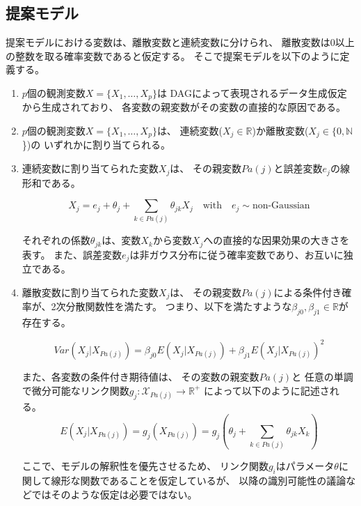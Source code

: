 
\subsection{提案モデル}

提案モデルにおける変数は、離散変数と連続変数に分けられ、
離散変数は0以上の整数を取る確率変数であると仮定する。
そこで提案モデルを以下のように定義する。

\begin{enumerate}
  \item
  $p$個の観測変数$X = \{ X_1, \dots, X_p \}$は
  DAGによって表現されるデータ生成仮定から生成されており、
  各変数の親変数がその変数の直接的な原因である。

  \item
  $p$個の観測変数$X = \{ X_1, \dots, X_p \}$は、
  連続変数($X_j \in \mathbb R$)か離散変数($X_j \in \{0, \mathbb N$\})の
  いずれかに割り当てられる。

  \item
  連続変数に割り当てられた変数$X_j$は、
  その親変数$Pa(j)$と誤差変数$e_j$の線形和である。

  \begin{equation}
    X_j = e_j + \theta_{j} + \sum_{k \in Pa(j)} \theta_{jk}X_j
    \quad \text{with} \quad e_j \sim \text{non-Gaussian}
    \label{eq:lingam_prop}
  \end{equation}

  それぞれの係数$\theta_{jk}$は、変数$X_k$から変数$X_j$への直接的な因果効果の大きさを表す。
  また、誤差変数$e_j$は非ガウス分布に従う確率変数であり、お互いに独立である。

  \item
  離散変数に割り当てられた変数$X_j$は、
  その親変数$Pa(j)$による条件付き確率が、2次分散関数性を満たす。
  つまり、以下を満たすような$\beta_{j0},\beta_{j1} \in \mathbb{R}$が存在する。

  \begin{equation}
    \mathit{Var}(X_j|X_{Pa(j)}) = \beta_{j0} E(X_j | X_{Pa(j)}) + \beta_{j1} E(X_j | X_{Pa(j)})^2
    \label{QVF_prop}
  \end{equation}

  また、各変数の条件付き期待値は、
  その変数の親変数$Pa(j)$と
  任意の単調で微分可能なリンク関数$g_j \colon \mathcal X_{Pa(j)} \rightarrow \mathbb R^+$
  によって以下のように記述される。
  \begin{equation}
    E(X_j | X_{Pa(j)})
    = g_j(X_{Pa(j)})
    = g_j \left(\theta_j + \sum_{k \in Pa(j)} \theta_{jk}X_k \right)
  \end{equation}

  ここで、モデルの解釈性を優先させるため、
  リンク関数$g_i$はパラメータ$\theta$に関して線形な関数であることを仮定しているが、
  以降の識別可能性の議論などではそのような仮定は必要ではない。
\end{enumerate}
